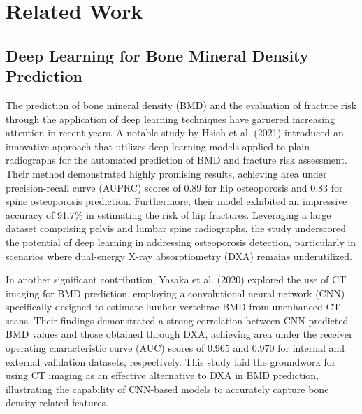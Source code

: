 \section{Related Work}
\subsection{Deep Learning for Bone Mineral Density Prediction}

The prediction of bone mineral density (BMD) and the evaluation of fracture risk through the application of deep learning techniques \cite{zhang2024deep} have garnered increasing attention in recent years. A notable study by Hsieh et al. (2021) \cite{hsieh2021automated} introduced an innovative approach that utilizes deep learning models applied to plain radiographs for the automated prediction of BMD and fracture risk assessment. Their method demonstrated highly promising results, achieving area under precision-recall curve (AUPRC) scores of 0.89 for hip osteoporosis and 0.83 for spine osteoporosis prediction. Furthermore, their model exhibited an impressive accuracy of 91.7\% in estimating the risk of hip fractures. Leveraging a large dataset comprising pelvis and lumbar spine radiographs, the study underscored the potential of deep learning in addressing osteoporosis detection, particularly in scenarios where dual-energy X-ray absorptiometry (DXA) remains underutilized.

In another significant contribution, Yasaka et al. (2020) \cite{yasaka2020prediction} explored the use of CT imaging for BMD prediction, employing a convolutional neural network (CNN) specifically designed to estimate lumbar vertebrae BMD from unenhanced CT scans. Their findings demonstrated a strong correlation between CNN-predicted BMD values and those obtained through DXA, achieving area under the receiver operating characteristic curve (AUC) scores of 0.965 and 0.970 for internal and external validation datasets, respectively. This study laid the groundwork for using CT imaging as an effective alternative to DXA in BMD prediction, illustrating the capability of CNN-based models to accurately capture bone density-related features.

